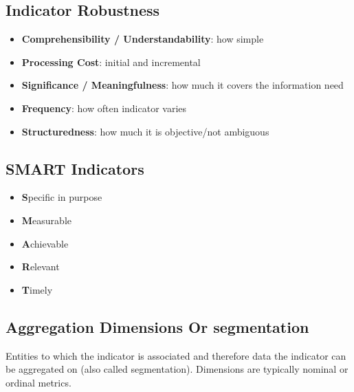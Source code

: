 \begin{flushleft}
  \begin{minipage}[t]{0.45\linewidth}
    \raggedright
    \subsection{Indicator Robustness}

    \begin{itemize}
      \item \textbf{Comprehensibility / Understandability}: how simple
      \item \textbf{Processing Cost}: initial and incremental
      \item \textbf{Significance / Meaningfulness}: how much it covers the information need
      \item \textbf{Frequency}: how often indicator varies
      \item \textbf{Structuredness}: how much it is objective/not ambiguous
    \end{itemize}

  \end{minipage}%
  \hfill
  \begin{minipage}[t]{0.45\linewidth}
    \raggedright
    \subsection{SMART Indicators}

    \begin{itemize}
      \item \textbf{S}pecific in purpose
      \item \textbf{M}easurable
      \item \textbf{A}chievable
      \item \textbf{R}elevant
      \item \textbf{T}imely
    \end{itemize}

  \end{minipage}
\end{flushleft}


\subsection{Aggregation Dimensions Or segmentation}

Entities to which the indicator is associated and therefore data the indicator can be
aggregated on (also called segmentation). Dimensions are typically nominal or ordinal metrics.

